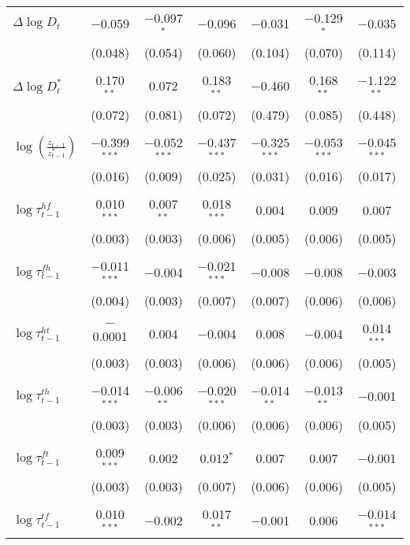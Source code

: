 \begin{tabular}{@{\extracolsep{5pt}}lcccccc}
 $\Delta \log D_t$ & $-$0.059 & $-$0.097$^{*}$ & $-$0.096 & $-$0.031 & $-$0.129$^{*}$ & $-$0.035 \\ 
  & (0.048) & (0.054) & (0.060) & (0.104) & (0.070) & (0.114) \\ 
  & & & & & & \\ 
 $\Delta \log D_t^*$ & 0.170$^{**}$ & 0.072 & 0.183$^{**}$ & $-$0.460 & 0.168$^{**}$ & $-$1.122$^{**}$ \\ 
  & (0.072) & (0.081) & (0.072) & (0.479) & (0.085) & (0.448) \\ 
  & & & & & & \\ 
 $\log \left(\frac{z_{t-1}}{z_{t-1}^*} \right)$ & $-$0.399$^{***}$ & $-$0.052$^{***}$ & $-$0.437$^{***}$ & $-$0.325$^{***}$ & $-$0.053$^{***}$ & $-$0.045$^{***}$ \\ 
  & (0.016) & (0.009) & (0.025) & (0.031) & (0.016) & (0.017) \\ 
  & & & & & & \\ 
 $\log \tau_{t-1}^{hf}$ & 0.010$^{***}$ & 0.007$^{**}$ & 0.018$^{***}$ & 0.004 & 0.009 & 0.007 \\ 
  & (0.003) & (0.003) & (0.006) & (0.005) & (0.006) & (0.005) \\ 
  & & & & & & \\ 
 $\log \tau_{t-1}^{fh}$ & $-$0.011$^{***}$ & $-$0.004 & $-$0.021$^{***}$ & $-$0.008 & $-$0.008 & $-$0.003 \\ 
  & (0.004) & (0.003) & (0.007) & (0.007) & (0.006) & (0.006) \\ 
  & & & & & & \\ 
 $\log \tau_{t-1}^{ht}$ & $-$0.0001 & 0.004 & $-$0.004 & 0.008 & $-$0.004 & 0.014$^{***}$ \\ 
  & (0.003) & (0.003) & (0.006) & (0.006) & (0.006) & (0.005) \\ 
  & & & & & & \\ 
 $\log \tau_{t-1}^{th}$ & $-$0.014$^{***}$ & $-$0.006$^{**}$ & $-$0.020$^{***}$ & $-$0.014$^{**}$ & $-$0.013$^{**}$ & $-$0.001 \\ 
  & (0.003) & (0.003) & (0.006) & (0.006) & (0.006) & (0.005) \\ 
  & & & & & & \\ 
 $\log \tau_{t-1}^{ft}$ & 0.009$^{***}$ & 0.002 & 0.012$^{*}$ & 0.007 & 0.007 & $-$0.001 \\ 
  & (0.003) & (0.003) & (0.007) & (0.006) & (0.006) & (0.005) \\ 
  & & & & & & \\ 
 $\log \tau_{t-1}^{tf}$ & 0.010$^{***}$ & $-$0.002 & 0.017$^{**}$ & $-$0.001 & 0.006 & $-$0.014$^{***}$ \\ 

\end{tabular}
